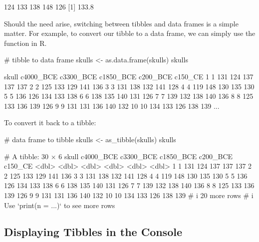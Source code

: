 \begin{outR}
[1] 124 133 138 148 126
[1] 133.8
\end{outR}

Should the need arise, switching between tibbles and data frames is a simple matter. For example, to convert our tibble  to a data frame, we can simply use the  function in R.

\begin{inR}
# tibble to data frame
skulls <- as.data.frame(skulls)
skulls
\end{inR}
\begin{outR}
   skull c4000_BCE c3300_BCE c1850_BCE c200_BCE c150_CE
1      1       131       124       137      137     137
2      2       125       133       129      141     136
3      3       131       138       132      141     128
4      4       119       148       130      135     130
5      5       136       126       134      133     138
6      6       138       135       140      131     126
7      7       139       132       138      140     136
8      8       125       133       136      139     126
9      9       131       131       136      140     132
10    10       134       133       126      138     139
...
\end{outR}

\noindent
To convert it back to a tibble:
\begin{inR}
# data frame to tibble
skulls <- as_tibble(skulls)
skulls
\end{inR}
\begin{outR}
# A tibble: 30 × 6
   skull c4000_BCE c3300_BCE c1850_BCE c200_BCE c150_CE
   <dbl>     <dbl>     <dbl>     <dbl>    <dbl>   <dbl>
 1     1       131       124       137      137     137
 2     2       125       133       129      141     136
 3     3       131       138       132      141     128
 4     4       119       148       130      135     130
 5     5       136       126       134      133     138
 6     6       138       135       140      131     126
 7     7       139       132       138      140     136
 8     8       125       133       136      139     126
 9     9       131       131       136      140     132
10    10       134       133       126      138     139
# i 20 more rows
# i Use `print(n = ...)` to see more rows
\end{outR}

\subsection{Displaying Tibbles in the Console}

